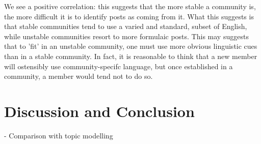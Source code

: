 \documentclass[11pt,a4paper]{article}
\begin{document}
We see a positive correlation: this suggests that the more stable a
community is, the more difficult it is to identify posts as coming
from it. What this suggests is that stable communities tend to use a
varied and standard, subset of English, while unstable communities
resort to more formulaic posts. This may suggests that to 'fit' in an
unstable community, one must use more obvious linguistic cues than in
a stable community. In fact, it is reasonable to think that a new
member will ostensibly use community-specifc language, but once
established in a community, a member would tend not to do so.

\section{Discussion and Conclusion}

- Comparison with topic modelling



\end{document}
